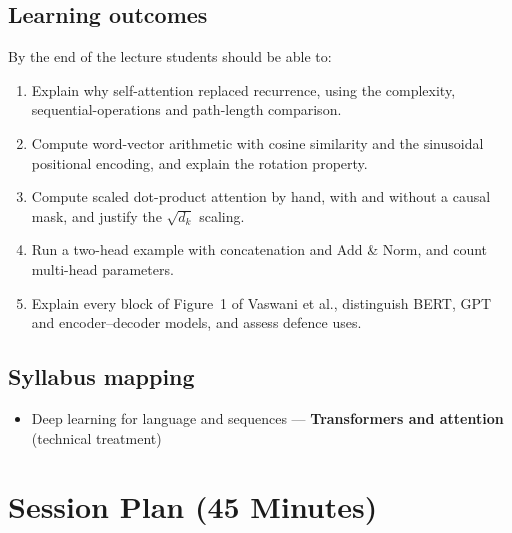 \documentclass[11pt]{article}
\begin{document}
\subsection*{Learning outcomes}By the end of the lecture students should be able to:\begin{enumerate}\item Explain why self-attention replaced recurrence, using the complexity, sequential-operations and path-length comparison.\item Compute word-vector arithmetic with cosine similarity and the sinusoidal positional encoding, and explain the rotation property.\item Compute scaled dot-product attention by hand, with and without a causal mask, and justify the $\sqrt{d_k}$ scaling.\item Run a two-head example with concatenation and Add \& Norm, and count multi-head parameters.\item Explain every block of Figure~1 of Vaswani et al., distinguish BERT, GPT and encoder--decoder models, and assess defence uses.\end{enumerate}

\subsection*{Syllabus mapping}\begin{itemize}\item Deep learning for language and sequences --- \textbf{Transformers and attention} (technical treatment)\end{itemize}

\section{Session Plan (45 Minutes)}
\end{document}
